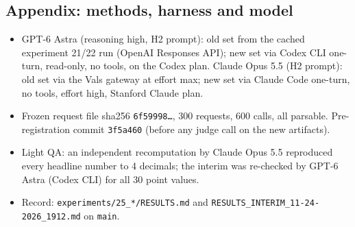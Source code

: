 \subsection*{Appendix: methods, harness and model}
\begin{itemize}
  \item GPT-6 Astra (reasoning high, H2 prompt): old set from the cached experiment 21/22 run (OpenAI Responses API); new set via Codex CLI one-turn, read-only, no tools, on the Codex plan. Claude Opus 5.5 (H2 prompt): old set via the Vals gateway at effort max; new set via Claude Code one-turn, no tools, effort high, Stanford Claude plan.
  \item Frozen request file sha256 \texttt{6f59998\ldots}, 300 requests, 600 calls, all parsable. Pre-registration commit \texttt{3f5a460} (before any judge call on the new artifacts).
  \item Light QA: an independent recomputation by Claude Opus 5.5 reproduced every headline number to 4 decimals; the interim was re-checked by GPT-6 Astra (Codex CLI) for all 30 point values.
  \item Record: \texttt{experiments/25\_*/RESULTS.md} and \texttt{RESULTS\_INTERIM\_11-24-2026\_1912.md} on \texttt{main}.
\end{itemize}
